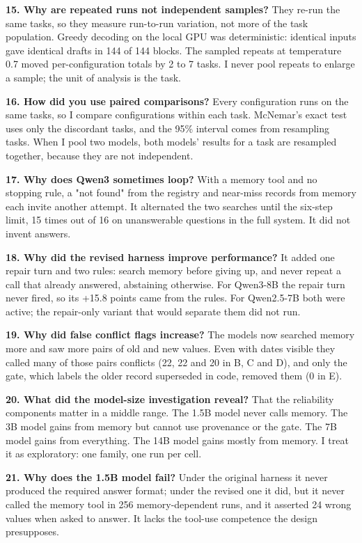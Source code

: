 \documentclass[10.5pt,a4paper,oneside]{report}
\begin{document}
\textbf{15. Why are repeated runs not independent samples?} They re-run the same tasks, so they measure run-to-run variation, not more of the task population. Greedy decoding on the local GPU was deterministic: identical inputs gave identical drafts in 144 of 144 blocks. The sampled repeats at temperature 0.7 moved per-configuration totals by 2 to 7 tasks. I never pool repeats to enlarge a sample; the unit of analysis is the task.

\textbf{16. How did you use paired comparisons?} Every configuration runs on the same tasks, so I compare configurations within each task. McNemar's exact test uses only the discordant tasks, and the 95\% interval comes from resampling tasks. When I pool two models, both models' results for a task are resampled together, because they are not independent.

\textbf{17. Why does Qwen3 sometimes loop?} With a memory tool and no stopping rule, a "not found" from the registry and near-miss records from memory each invite another attempt. It alternated the two searches until the six-step limit, 15 times out of 16 on unanswerable questions in the full system. It did not invent answers.

\textbf{18. Why did the revised harness improve performance?} It added one repair turn and two rules: search memory before giving up, and never repeat a call that already answered, abstaining otherwise. For Qwen3-8B the repair turn never fired, so its +15.8 points came from the rules. For Qwen2.5-7B both were active; the repair-only variant that would separate them did not run.

\textbf{19. Why did false conflict flags increase?} The models now searched memory more and saw more pairs of old and new values. Even with dates visible they called many of those pairs conflicts (22, 22 and 20 in B, C and D), and only the gate, which labels the older record superseded in code, removed them (0 in E).

\textbf{20. What did the model-size investigation reveal?} That the reliability components matter in a middle range. The 1.5B model never calls memory. The 3B model gains from memory but cannot use provenance or the gate. The 7B model gains from everything. The 14B model gains mostly from memory. I treat it as exploratory: one family, one run per cell.

\textbf{21. Why does the 1.5B model fail?} Under the original harness it never produced the required answer format; under the revised one it did, but it never called the memory tool in 256 memory-dependent runs, and it asserted 24 wrong values when asked to answer. It lacks the tool-use competence the design presupposes.
\end{document}
